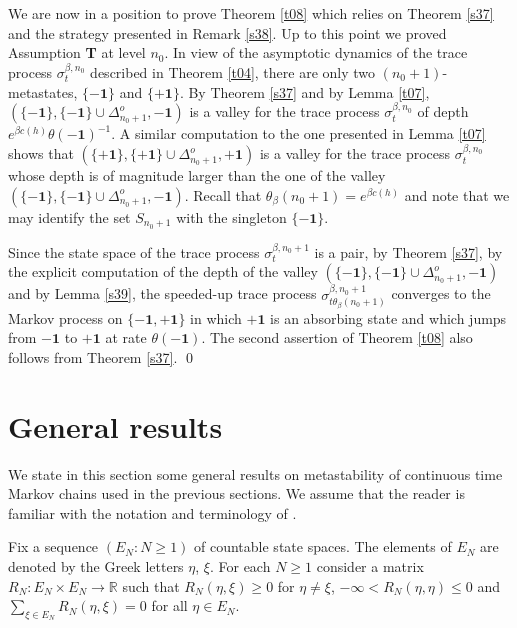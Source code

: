 \documentclass[reqno]{amsart}
\begin{document}
We are now in a position to prove Theorem \ref{t08} which relies on
Theorem \ref{s37} and the strategy presented in Remark \ref{s38}. Up
to this point we proved Assumption {\bf T} at level $n_0$. In view of
the asymptotic dynamics of the trace process $\sigma^{\beta, n_0}_t$
described in Theorem \ref{t04}, there are only two
$(n_0+1)$-metastates, $\{- {{\mathbf 1}}\}$ and $\{+ {{\mathbf 1}}\}$.  By Theorem
\ref{s37} and by Lemma \ref{t07}, $(\{- {{\mathbf 1}}\} , \{- {{\mathbf 1}}\} \cup
\Delta^o_{n_0+1}, - {{\mathbf 1}})$ is a valley for the trace process
$\sigma^{\beta, n_0}_t$ of depth $e^{\beta c(h)} \theta(-{{\mathbf 1}})^{-1}$. A similar computation to the one presented in Lemma
\ref{t07} shows that $(\{+ {{\mathbf 1}}\} , \{+ {{\mathbf 1}}\}\cup \Delta^o_{n_0+1},
+ {{\mathbf 1}})$ is a valley for the trace process $\sigma^{\beta, n_0}_t$
whose depth is of magnitude larger than the one of the valley $(\{-
{{\mathbf 1}}\} , \{- {{\mathbf 1}}\} \cup \Delta^o_{n_0+1}, - {{\mathbf 1}})$. Recall that
$\theta_\beta(n_0+1) = e^{\beta c(h)}$ and note that we may identify
the set $S_{n_0+1}$ with the singleton $\{- {{\mathbf 1}}\}$.

Since the state space of the trace process $\sigma^{\beta, n_0+1}_{t}$
is a pair, by Theorem \ref{s37}, by the explicit computation of the
depth of the valley $(\{- {{\mathbf 1}}\} , \{- {{\mathbf 1}}\} \cup \Delta^o_{n_0+1},
- {{\mathbf 1}})$ and by Lemma \ref{s39}, the speeded-up trace process
$\sigma^{\beta, n_0+1}_{t \theta_\beta(n_0+1)}$ converges to the
Markov process on $\{-{{\mathbf 1}}, +{{\mathbf 1}}\}$ in which $+{{\mathbf 1}}$ is an
absorbing state and which jumps from $-{{\mathbf 1}}$ to $+ {{\mathbf 1}}$ at rate
$\theta(-{{\mathbf 1}})$. The second assertion of Theorem \ref{t08} also
follows from Theorem \ref{s37}. \qed

\section{General results}
\label{sec2}

We state in this section some general results on metastability of
continuous time Markov chains used in the previous sections. We assume
that the reader is familiar with the notation and terminology of
\cite{bl2}.

Fix a sequence $(E_N: N\ge 1)$ of countable state spaces. The elements
of $E_N$ are denoted by the Greek letters $\eta$, $\xi$. For each
$N\ge 1$ consider a matrix $R_N : E_N \times E_N \to {{\mathbb R}}$ such that
$R_N(\eta, \xi) \ge 0$ for $\eta \not = \xi$, $-\infty < R_N (\eta,
\eta)\le 0$ and $\sum_{\xi\in E_N} R_N(\eta,\xi)=0$ for all $\eta\in
E_N$.  
\end{document}
